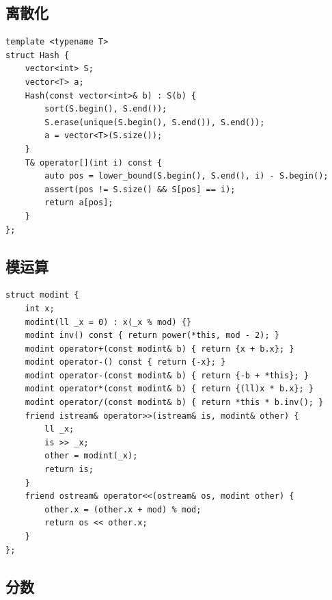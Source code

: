 \documentclass[UTF8]{ctexart}
\begin{document}
\begin{sloppypar}
\subsection{离散化}

\begin{lstlisting}[style=cpp]
template <typename T>
struct Hash {
    vector<int> S;
    vector<T> a;
    Hash(const vector<int>& b) : S(b) {
        sort(S.begin(), S.end());
        S.erase(unique(S.begin(), S.end()), S.end());
        a = vector<T>(S.size());
    }
    T& operator[](int i) const {
        auto pos = lower_bound(S.begin(), S.end(), i) - S.begin();
        assert(pos != S.size() && S[pos] == i);
        return a[pos];
    }
};
\end{lstlisting}

\subsection{模运算}

\begin{lstlisting}[style=cpp]
struct modint {
    int x;
    modint(ll _x = 0) : x(_x % mod) {}
    modint inv() const { return power(*this, mod - 2); }
    modint operator+(const modint& b) { return {x + b.x}; }
    modint operator-() const { return {-x}; }
    modint operator-(const modint& b) { return {-b + *this}; }
    modint operator*(const modint& b) { return {(ll)x * b.x}; }
    modint operator/(const modint& b) { return *this * b.inv(); }
    friend istream& operator>>(istream& is, modint& other) {
        ll _x;
        is >> _x;
        other = modint(_x);
        return is;
    }
    friend ostream& operator<<(ostream& os, modint other) {
        other.x = (other.x + mod) % mod;
        return os << other.x;
    }
};
\end{lstlisting}

\subsection{分数}


\end{sloppypar}
\end{document}
